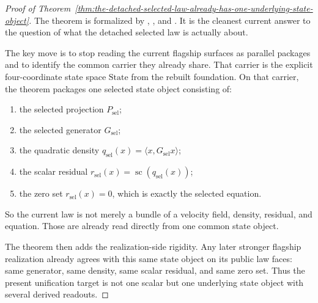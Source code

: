 \begin{proof}[Proof of Theorem~\ref{thm:the-detached-selected-law-already-has-one-underlying-state-object}]
\label{proof:thm:the-detached-selected-law-already-has-one-underlying-state-object}
The theorem is formalized by
,
, and
. It is
the cleanest current answer to the question of what the detached selected law
is actually about.

The key move is to stop reading the current flagship surfaces as parallel
packages and to identify the common carrier they already share. That carrier is
the explicit four-coordinate state space \(\mathrm{State}\) from the rebuilt
foundation. On that carrier, the theorem packages one selected state object
consisting of:
\begin{enumerate}
\item the selected projection \(P_{\mathrm{sel}}\);
\item the selected generator \(G_{\mathrm{sel}}\);
\item the quadratic density
      \(q_{\mathrm{sel}}(x)=\langle x,G_{\mathrm{sel}}x\rangle\);
\item the scalar residual
      \(r_{\mathrm{sel}}(x)=\operatorname{sc}(q_{\mathrm{sel}}(x))\);
\item the zero set \(r_{\mathrm{sel}}(x)=0\), which is exactly the selected
      equation.
\end{enumerate}
So the current law is not merely a bundle of a velocity field, density,
residual, and equation. Those are already read directly from one common state
object.

The theorem then adds the realization-side rigidity. Any later stronger
flagship realization already agrees with this same state object on its public
law faces: same generator, same density, same scalar residual, and same zero
set. Thus the present unification target is not one scalar but one underlying
state object with several derived readouts.
\end{proof}

